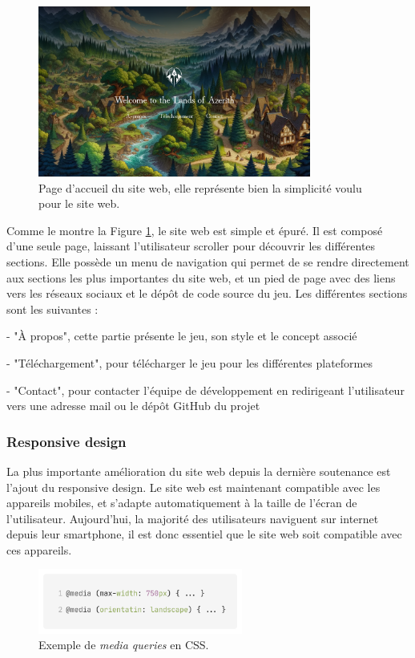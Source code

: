 \begin{figure}[H]
    \centering
    \includegraphics[width=0.8\textwidth]{assets/website1.png}
    \caption{Page d'accueil du site web, elle représente bien la simplicité voulu pour le site web.}
    \label{fig:website1}
\end{figure}

Comme le montre la Figure \ref*{fig:website1}, le site web est simple et épuré.
Il est composé d'une seule page, laissant l'utilisateur scroller pour découvrir les différentes sections.
Elle possède un menu de navigation qui permet de se rendre directement aux sections les plus importantes du site web, et un pied de page avec des liens vers les réseaux sociaux et le dépôt de code source du jeu.
Les différentes sections sont les suivantes :

- "À propos", cette partie présente le jeu, son style et le concept associé

- "Téléchargement", pour télécharger le jeu pour les différentes plateformes

- "Contact", pour contacter l'équipe de développement en redirigeant l'utilisateur vers une adresse mail ou le dépôt GitHub du projet

\subsubsection{Responsive design}

La plus importante amélioration du site web depuis la dernière soutenance est l'ajout du responsive design.
Le site web est maintenant compatible avec les appareils mobiles, et s'adapte automatiquement à la taille de l'écran de l'utilisateur.
Aujourd'hui, la majorité des utilisateurs naviguent sur internet depuis leur smartphone, il est donc essentiel que le site web soit compatible avec ces appareils.

\begin{figure}[H]
    \centering
    \includegraphics[width=0.6\textwidth]{assets/website2.png}
    \caption{Exemple de \textit{media queries} en CSS.}
    \label{fig:website2}
\end{figure}

